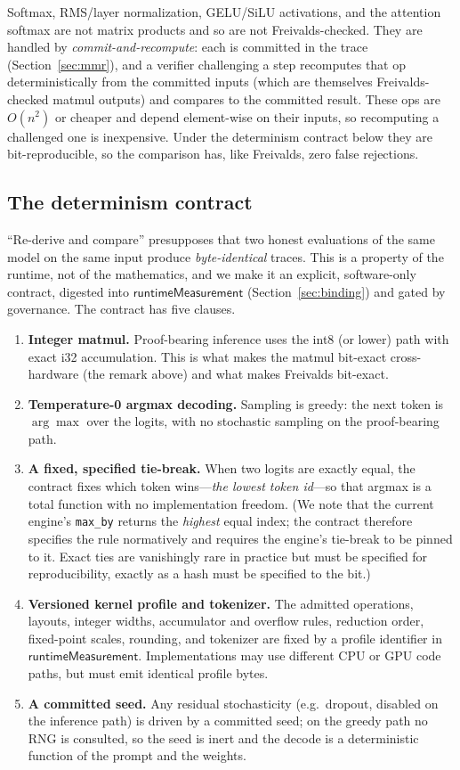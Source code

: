 Softmax, RMS/layer normalization, GELU/SiLU activations, and the attention softmax
are not matrix products and so are not Freivalds-checked. They are handled by
\emph{commit-and-recompute}: each is committed in the trace (Section~\ref{sec:mmr}),
and a verifier challenging a step recomputes that op deterministically from the
committed inputs (which are themselves Freivalds-checked matmul outputs) and compares
to the committed result. These ops are $O(n^2)$ or cheaper and depend
element-wise on their inputs, so recomputing a challenged one is inexpensive. Under
the determinism contract below they are bit-reproducible, so the comparison has, like
Freivalds, zero false rejections.

\subsection{The determinism contract}
\label{sec:determinism}

``Re-derive and compare'' presupposes that two honest evaluations of the same model
on the same input produce \emph{byte-identical} traces. This is a property of the
runtime, not of the mathematics, and we make it an explicit, software-only contract,
digested into $\mathsf{runtimeMeasurement}$ (Section~\ref{sec:binding}) and gated by
governance. The contract has five clauses.

\begin{enumerate}[leftmargin=1.6em]
\item \textbf{Integer matmul.} Proof-bearing inference uses the int8 (or lower) path
with exact i32 accumulation. This is what makes the matmul bit-exact cross-hardware
(the remark above) and what makes Freivalds bit-exact.
\item \textbf{Temperature-0 argmax decoding.} Sampling is greedy: the next token is
$\arg\max$ over the logits, with no stochastic sampling on the proof-bearing path.
\item \textbf{A fixed, specified tie-break.} When two logits are exactly equal, the
contract fixes which token wins---\emph{the lowest token id}---so that argmax is a
total function with no implementation freedom. (We note that the current engine's
\texttt{max\_by} returns the \emph{highest} equal index; the contract therefore
specifies the rule normatively and requires the engine's tie-break to be pinned to
it. Exact ties are vanishingly rare in practice but must be specified for
reproducibility, exactly as a hash must be specified to the bit.)
\item \textbf{Versioned kernel profile and tokenizer.} The admitted operations,
layouts, integer widths, accumulator and overflow rules, reduction order, fixed-point
scales, rounding, and tokenizer are fixed by a profile identifier in
$\mathsf{runtimeMeasurement}$. Implementations may use different CPU or GPU code paths,
but must emit identical profile bytes.
\item \textbf{A committed seed.} Any residual stochasticity (e.g.\ dropout, disabled
on the inference path) is driven by a committed seed; on the greedy path no RNG is
consulted, so the seed is inert and the decode is a deterministic function of the
prompt and the weights.
\end{enumerate}

